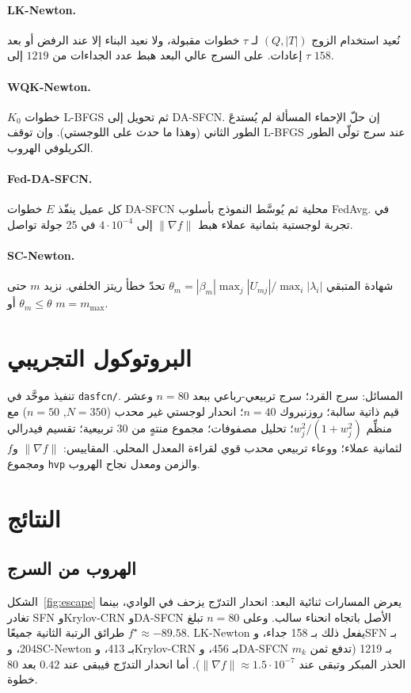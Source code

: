 \documentclass[12pt,a4paper]{article}
\theoremstyle{definition}
\begin{document}
\paragraph{\textenglish{LK-Newton}.}
نُعيد استخدام الزوج $(Q,|T|)$ لـ $\tau$ خطوات مقبولة، ولا نعيد البناء إلا
عند الرفض أو بعد $\tau$ إعادات. على السرج عالي البعد هبط عدد الجداءات من
$1219$ إلى $158$.

\paragraph{\textenglish{WQK-Newton}.}
$K_0$ خطوات \textenglish{L-BFGS} ثم تحويل إلى \textenglish{DA-SFCN}.
إن حلّ الإحماء المسألة لم يُستدعَ الطور الثاني (وهذا ما حدث على اللوجستي).
وإن توقف \textenglish{L-BFGS} عند سرج تولّى الطور الكريلوفي الهروب.

\paragraph{\textenglish{Fed-DA-SFCN}.}
كل عميل ينفّذ $E$ خطوات \textenglish{DA-SFCN} محلية ثم يُوسَّط النموذج
بأسلوب \textenglish{FedAvg}. في تجربة لوجستية بثمانية عملاء هبط
$\|\nabla f\|$ إلى $4\cdot 10^{-4}$ في 25 جولة تواصل.

\paragraph{\textenglish{SC-Newton}.}
شهادة المتبقي
$\theta_m=|\beta_m|\max_j|U_{mj}|/\max_i|\lambda_i|$
تحدّ خطأ ريتز الخلفي. نزيد $m$ حتى $\theta_m\le\theta$ أو $m=m_{\max}$.

\section{البروتوكول التجريبي}
تنفيذ موحَّد في \textenglish{\texttt{dasfcn/}}. المسائل: سرج القرد؛ سرج
تربيعي-رباعي ببعد $n=80$ وعشر قيم ذاتية سالبة؛ روزنبروك $n=40$؛ انحدار
لوجستي غير محدب ($N=350$, $n=50$) مع منظِّم $w_j^2/(1+w_j^2)$؛ تحليل
مصفوفات؛ مجموع منتهٍ من 30 تربيعية؛ تقسيم فيدرالي لثمانية عملاء؛ ووعاء
تربيعي محدب قوي لقراءة المعدل المحلي.
المقاييس: $\|\nabla f\|$ و$f$ ومجموع \texttt{hvp} والزمن ومعدل نجاح الهروب.

\section{النتائج}
\subsection{الهروب من السرج}
الشكل~\ref{fig:escape} يعرض المسارات ثنائية البعد: انحدار التدرّج يزحف في
الوادي، بينما تغادر \textenglish{SFN} و\textenglish{Krylov-CRN}
و\textenglish{DA-SFCN} الأصل باتجاه انحناء سالب.
وعلى $n=80$ تبلغ طرائق الرتبة الثانية جميعًا $f^\star\approx -89.58$.
\textenglish{LK-Newton} يفعل ذلك بـ 158 جداء، و\textenglish{SFN} بـ 204،
و\textenglish{SC-Newton} بـ 413، و\textenglish{Krylov-CRN} بـ 456،
و\textenglish{DA-SFCN} بـ 1219 (تدفع ثمن $m_k$ الحذر المبكر وتبقى عند
$\|\nabla f\|\approx 1.5\cdot 10^{-7}$). أما انحدار التدرّج فيبقى عند
$0.42$ بعد 80 خطوة.
\end{document}
